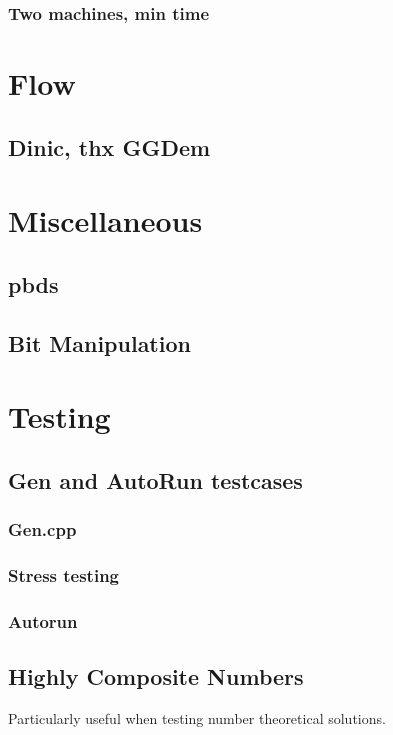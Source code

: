 \subsubsection{Two machines, min time}

\section{Flow}
\subsection{Dinic, thx GGDem}

\section{Miscellaneous}
\subsection{pbds}
\subsection{Bit Manipulation}


\section{Testing}
\subsection{Gen and AutoRun testcases}
\subsubsection{Gen.cpp}
\subsubsection{Stress testing}

\subsubsection{Autorun}

\subsection{Highly Composite Numbers}
Particularly useful when testing number theoretical solutions.





